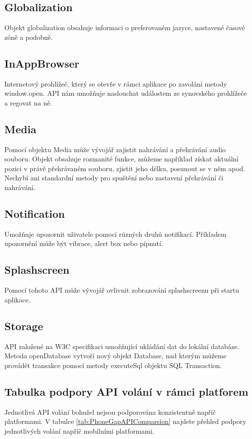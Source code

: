 \subsection{Globalization}
Objekt globalization obsahuje informaci o preferovaném jazyce, nastavené časové zóně a podobně.

\subsection{InAppBrowser}
Internetový prohlížeč, který se otevře v rámci aplikace po zavolání metody window.open. API nám umožňuje naslouchat událostem ze synovského prohlížeče a regovat na ně.

\subsection{Media}
Pomocí objektu Media může vývojář zajistit nahrávání a přehrávání audio souboru. Objekt obsahuje rozmanité funkce, můžeme například získat aktuální pozici v právě přehrávaném souboru, zjistit jeho délku, posunout se v něm apod. Nechybí ani standardní metody pro spuštění nebo zastavení přehrávání či nahrávání.

\subsection{Notification}
Umožňuje upozornit uživatele pomocí různých druhů notifikací. Příkladem upozornění může být vibrace, alert box nebo pípnutí.

\subsection{Splashscreen}
Pomocí tohoto API může vývojář ovlivnit zobrazování splashscreenu při startu aplikace.

\subsection{Storage}
API založené na W3C specifikaci umožňující ukládání dat do lokální databáze. Metoda openDatabase vytvoří nový objekt Database, nad kterým můžeme provádět transakce pomocí metody executeSql objektu SQL Transaction.

\subsection{Tabulka podpory API volání v rámci platforem}
Jednotlivá API volání bohužel nejsou podporována konzistentně napříč platformami. V tabulce \ref{tab:PhoneGapAPIComparsion} najdete přehled podpory jednotlivých volání napříč mobilními platformami.

